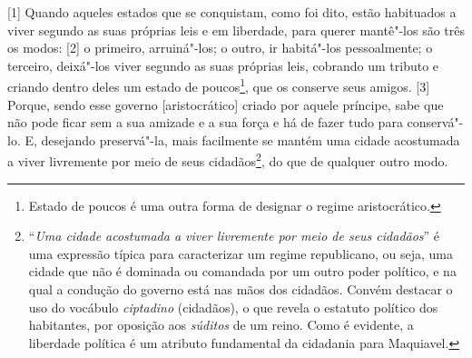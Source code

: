 
{[}1{]} Quando aqueles estados que se conquistam, como foi dito, estão
habituados a viver segundo as suas próprias leis e em liberdade, para
querer mantê"-los são três os modos: {[}2{]} o primeiro, arruiná"-los; o
outro, ir habitá"-los pessoalmente; o terceiro, deixá"-los viver segundo
as suas próprias leis, cobrando um tributo e criando dentro deles um
estado de poucos\footnote{Estado de poucos é uma outra forma de designar
  o regime aristocrático.}, que os conserve seus amigos. {[}3{]} Porque,
sendo esse governo {[}aristocrático{]} criado por aquele príncipe, sabe
que não pode ficar sem a sua amizade e a sua força e há de fazer tudo
para conservá"-lo. E, desejando preservá"-la, mais facilmente se mantém
uma cidade acostumada a viver livremente por meio de seus
cidadãos\footnote{``\emph{Uma cidade acostumada a viver livremente por
  meio de seus cidadãos}'' é uma expressão típica para caracterizar um
  regime republicano, ou seja, uma cidade que não é dominada ou
  comandada por um outro poder político, e na qual a condução do governo
  está nas mãos dos cidadãos. Convém destacar o uso do vocábulo
  \emph{ciptadino} (cidadãos), o que revela o estatuto político dos
  habitantes, por oposição aos \emph{súditos} de um reino. Como é
  evidente, a liberdade política é um atributo fundamental da cidadania
  para Maquiavel.}, do que de qualquer outro modo.

